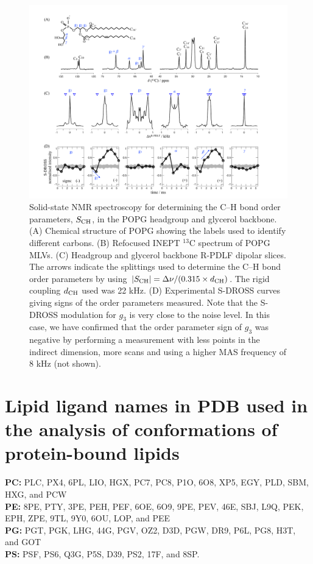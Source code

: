 \documentclass[journal=jpcbfk]{achemso}
\begin{document}
\begin{figure}[]
  \includegraphics[width=\textwidth]{./Figs/POPG_SI.pdf}
  \caption{\label{POPGspectra}
    Solid-state NMR spectroscopy for determining the C--H bond order parameters, $S_{\rm{CH}}$, in the POPG headgroup and glycerol backbone. (A) Chemical structure of POPG showing the labels used to identify different carbons.
    (B) Refocused INEPT $^{13}$C spectrum of POPG MLVs.
    (C) Headgroup and glycerol backbone R-PDLF dipolar slices. The arrows indicate the splittings used to determine the C--H bond order parameters by using  $|S_{\rm{CH}}|=\Delta\nu/(0.315 \times d_{\rm{CH}})$. The rigid coupling $d_{\rm{CH}}$ used was 22 kHz.
    (D) Experimental S-DROSS curves giving signs of the order parameters measured.  Note that the S-DROSS modulation for $g_3$ is very close to the noise level. In this case, we have confirmed that the order parameter sign of $g_3$ was negative by performing a measurement with less points in the indirect dimension, more scans and using a higher MAS frequency of 8 kHz (not shown). 
  }
\end{figure}


\clearpage
\section{Lipid ligand names in PDB used in the analysis of conformations of protein-bound lipids}
{\bf PC:} PLC, PX4, 6PL, LIO, HGX, PC7, PC8, P1O, 6O8, XP5, EGY, PLD, SBM, HXG, and PCW \\
{\bf PE:} 8PE, PTY, 3PE, PEH, PEF, 6OE, 6O9, 9PE, PEV, 46E, SBJ, L9Q, PEK, EPH, ZPE, 9TL, 9Y0, 6OU, LOP, and PEE \\
{\bf PG:} PGT, PGK, LHG, 44G, PGV, OZ2, D3D, PGW, DR9, P6L, PG8, H3T, and GOT \\
{\bf PS:} PSF, PS6, Q3G, P5S, D39, PS2, 17F, and 8SP.
\end{document}
